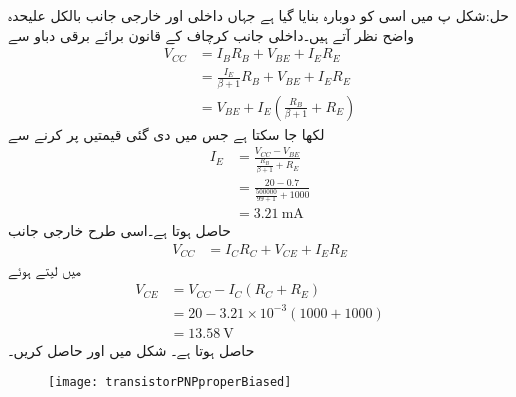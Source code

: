 حل:شکل  پ میں اسی کو دوبارہ بنایا گیا ہے جہاں داخلی اور خارجی جانب بالکل علیحدہ واضح نظر آتے ہیں۔داخلی جانب کرچاف کے قانون برائے برقی دباو سے
\begin{align*}
V_{CC}&=I_B R_B +V_{BE}+I_E R_E \\
&=\frac{I_E}{\beta +1} R_B + V_{BE}+I_E R_E\\
&=V_{BE}+I_E \left(\frac{R_B}{\beta+1}+R_E \right)
\end{align*}
لکھا جا سکتا ہے جس میں دی گئی قیمتیں پر کرنے سے
\begin{align*}
I_E&=\frac{V_{CC}-V_{BE}}{\frac{R_B}{\beta+1}+R_E}\\
&=\frac{20-0.7}{\frac{500000}{99+1}+1000}\\
&=\SI{3.21}{\milli \ampere}
\end{align*}
حاصل ہوتا ہے۔اسی طرح خارجی جانب 
\begin{align*}
V_{CC}&=I_C R_C +V_{CE}+I_E R_E
\end{align*}
میں  لیتے ہوئے
\begin{align*}
V_{CE}&=V_{CC}-I_C \left(R_C+R_E \right)\\
&=20-3.21 \times 10^{-3} \left(1000+1000 \right)\\
&=\SI{13.58}{\volt}
\end{align*}
حاصل ہوتا ہے۔
شکل  میں  اور  حاصل کریں۔
\begin{figure}
\centering
\texttt{[image: transistorPNPproperBiased]}
\caption{}
\label{شکل_ایک_منبع_سے_نکتہ_کارکردگی_کا_حصول_الف}
\end{figure}

